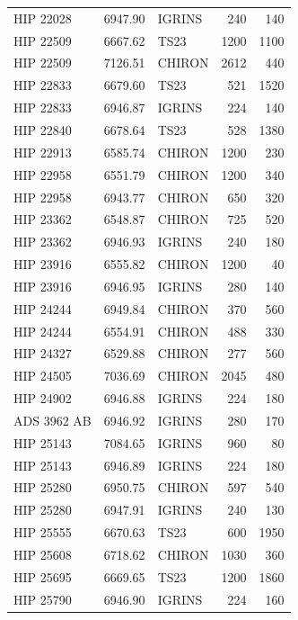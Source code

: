 {\begin{scriptsize}
\begin{longtable}{|l|rlrr|}
   HIP 22028 &  6947.90 &     IGRINS &      240 &   140 \\
   HIP 22509 &  6667.62 &       TS23 &     1200 &  1100 \\
   HIP 22509 &  7126.51 &     CHIRON &     2612 &   440 \\
   HIP 22833 &  6679.60 &       TS23 &      521 &  1520 \\
   HIP 22833 &  6946.87 &     IGRINS &      224 &   140 \\
   HIP 22840 &  6678.64 &       TS23 &      528 &  1380 \\
   HIP 22913 &  6585.74 &     CHIRON &     1200 &   230 \\
   HIP 22958 &  6551.79 &     CHIRON &     1200 &   340 \\
   HIP 22958 &  6943.77 &     CHIRON &      650 &   320 \\
   HIP 23362 &  6548.87 &     CHIRON &      725 &   520 \\
   HIP 23362 &  6946.93 &     IGRINS &      240 &   180 \\
   HIP 23916 &  6555.82 &     CHIRON &     1200 &    40 \\
   HIP 23916 &  6946.95 &     IGRINS &      280 &   140 \\
   HIP 24244 &  6949.84 &     CHIRON &      370 &   560 \\
   HIP 24244 &  6554.91 &     CHIRON &      488 &   330 \\
   HIP 24327 &  6529.88 &     CHIRON &      277 &   560 \\
   HIP 24505 &  7036.69 &     CHIRON &     2045 &   480 \\
   HIP 24902 &  6946.88 &     IGRINS &      224 &   180 \\
 ADS 3962 AB &  6946.92 &     IGRINS &      280 &   170 \\
   HIP 25143 &  7084.65 &     IGRINS &      960 &    80 \\
   HIP 25143 &  6946.89 &     IGRINS &      224 &   180 \\
   HIP 25280 &  6950.75 &     CHIRON &      597 &   540 \\
   HIP 25280 &  6947.91 &     IGRINS &      240 &   130 \\
   HIP 25555 &  6670.63 &       TS23 &      600 &  1950 \\
   HIP 25608 &  6718.62 &     CHIRON &     1030 &   360 \\
   HIP 25695 &  6669.65 &       TS23 &     1200 &  1860 \\
   HIP 25790 &  6946.90 &     IGRINS &      224 &   160 \\

\end{longtable}
\end{scriptsize}}
